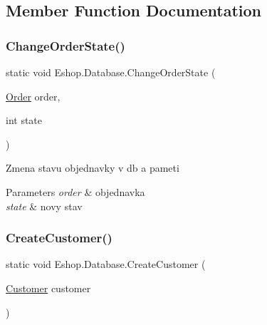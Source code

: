 \subsection{Member Function Documentation}
\mbox{\label{class_eshop_1_1_database_a8df93acf09e8978c520cd83da7393fe7}} 
\subsubsection{\texorpdfstring{ChangeOrderState()}{ChangeOrderState()}}
{\footnotesize\ttfamily static void Eshop.\+Database.\+Change\+Order\+State (\begin{DoxyParamCaption}\item[{\mbox{\hyperlink{class_eshop_1_1_order}{Order}}}]{order,  }\item[{int}]{state }\end{DoxyParamCaption})\hspace{0.3cm}{\ttfamily [static]}}



Zmena stavu objednavky v db a pameti 


\begin{DoxyParams}{Parameters}
{\em order} & objednavka\\
\hline
{\em state} & novy stav\\
\hline
\end{DoxyParams}
\mbox{\label{class_eshop_1_1_database_ad1ca42e5306e3151dbe0e3be03d89eec}} 
\subsubsection{\texorpdfstring{CreateCustomer()}{CreateCustomer()}}
{\footnotesize\ttfamily static void Eshop.\+Database.\+Create\+Customer (\begin{DoxyParamCaption}\item[{\mbox{\hyperlink{class_eshop_1_1_customer}{Customer}}}]{customer }\end{DoxyParamCaption})\hspace{0.3cm}{\ttfamily [static]}}



